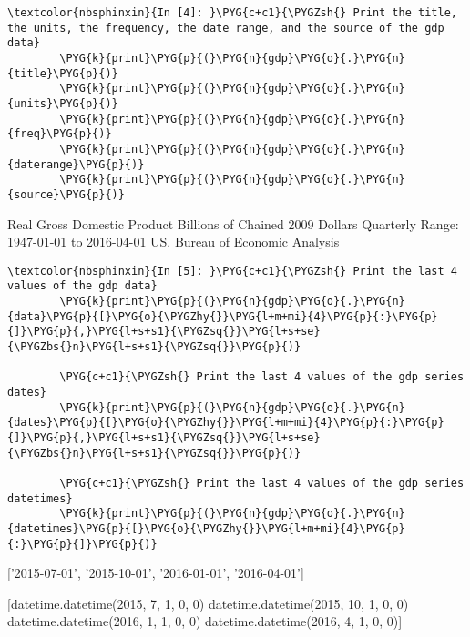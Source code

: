 \documentclass[letterpaper,10pt,openany,oneside,english]{sphinxmanual}
\begin{document}
\begin{Verbatim}[commandchars=\\\{\}]
\textcolor{nbsphinxin}{In [4]: }\PYG{c+c1}{\PYGZsh{} Print the title, the units, the frequency, the date range, and the source of the gdp data}
        \PYG{k}{print}\PYG{p}{(}\PYG{n}{gdp}\PYG{o}{.}\PYG{n}{title}\PYG{p}{)}
        \PYG{k}{print}\PYG{p}{(}\PYG{n}{gdp}\PYG{o}{.}\PYG{n}{units}\PYG{p}{)}
        \PYG{k}{print}\PYG{p}{(}\PYG{n}{gdp}\PYG{o}{.}\PYG{n}{freq}\PYG{p}{)}
        \PYG{k}{print}\PYG{p}{(}\PYG{n}{gdp}\PYG{o}{.}\PYG{n}{daterange}\PYG{p}{)}
        \PYG{k}{print}\PYG{p}{(}\PYG{n}{gdp}\PYG{o}{.}\PYG{n}{source}\PYG{p}{)}
\end{Verbatim}
\begin{OriginalVerbatim}[commandchars=\\\{\}]
Real Gross Domestic Product
Billions of Chained 2009 Dollars
Quarterly
Range: 1947-01-01 to 2016-04-01
US. Bureau of Economic Analysis
\end{OriginalVerbatim}
\begin{Verbatim}[commandchars=\\\{\}]
\textcolor{nbsphinxin}{In [5]: }\PYG{c+c1}{\PYGZsh{} Print the last 4 values of the gdp data}
        \PYG{k}{print}\PYG{p}{(}\PYG{n}{gdp}\PYG{o}{.}\PYG{n}{data}\PYG{p}{[}\PYG{o}{\PYGZhy{}}\PYG{l+m+mi}{4}\PYG{p}{:}\PYG{p}{]}\PYG{p}{,}\PYG{l+s+s1}{\PYGZsq{}}\PYG{l+s+se}{\PYGZbs{}n}\PYG{l+s+s1}{\PYGZsq{}}\PYG{p}{)}
        
        \PYG{c+c1}{\PYGZsh{} Print the last 4 values of the gdp series dates}
        \PYG{k}{print}\PYG{p}{(}\PYG{n}{gdp}\PYG{o}{.}\PYG{n}{dates}\PYG{p}{[}\PYG{o}{\PYGZhy{}}\PYG{l+m+mi}{4}\PYG{p}{:}\PYG{p}{]}\PYG{p}{,}\PYG{l+s+s1}{\PYGZsq{}}\PYG{l+s+se}{\PYGZbs{}n}\PYG{l+s+s1}{\PYGZsq{}}\PYG{p}{)}
        
        \PYG{c+c1}{\PYGZsh{} Print the last 4 values of the gdp series datetimes}
        \PYG{k}{print}\PYG{p}{(}\PYG{n}{gdp}\PYG{o}{.}\PYG{n}{datetimes}\PYG{p}{[}\PYG{o}{\PYGZhy{}}\PYG{l+m+mi}{4}\PYG{p}{:}\PYG{p}{]}\PYG{p}{)}
\end{Verbatim}
\begin{OriginalVerbatim}[commandchars=\\\{\}]
[ 16454.9  16490.7  16525.   16570.2]

['2015-07-01', '2015-10-01', '2016-01-01', '2016-04-01']

[datetime.datetime(2015, 7, 1, 0, 0) datetime.datetime(2015, 10, 1, 0, 0)
 datetime.datetime(2016, 1, 1, 0, 0) datetime.datetime(2016, 4, 1, 0, 0)]
\end{OriginalVerbatim}
\end{document}
